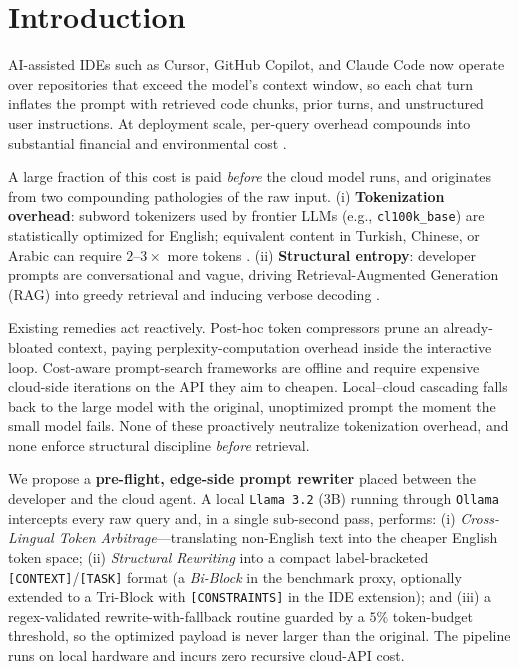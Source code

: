 \documentclass[11pt,a4paper,twocolumn]{article}
\begin{document}
\section{Introduction}
AI-assisted IDEs such as Cursor, GitHub Copilot, and Claude Code now operate over repositories that exceed the model's context window, so each chat turn inflates the prompt with retrieved code chunks, prior turns, and unstructured user instructions. At deployment scale, per-query overhead compounds into substantial financial and environmental cost \cite{du2026ockbench, peng2025coffe}.

A large fraction of this cost is paid \textit{before} the cloud model runs, and originates from two compounding pathologies of the raw input. (i) \textbf{Tokenization overhead}: subword tokenizers used by frontier LLMs (e.g., \texttt{cl100k\_base}) are statistically optimized for English; equivalent content in Turkish, Chinese, or Arabic can require $2$--$3\times$ more tokens \cite{petrov2023language, teklehaymanot2025tokenization}. (ii) \textbf{Structural entropy}: developer prompts are conversational and vague, driving Retrieval-Augmented Generation (RAG) into greedy retrieval \cite{jimenez2024swebench} and inducing verbose decoding \cite{ahuja2025efficientxlang}.

Existing remedies act reactively. Post-hoc token compressors \cite{jiang-etal-2023-llmlingua, shi2025longcodezip} prune an already-bloated context, paying perplexity-computation overhead inside the interactive loop. Cost-aware prompt-search frameworks \cite{taherkhani2025epic, zehle2025capo} are offline and require expensive cloud-side iterations on the API they aim to cheapen. Local--cloud cascading \cite{lu2026mccom, chen2024modelcascading} falls back to the large model with the original, unoptimized prompt the moment the small model fails. None of these proactively neutralize tokenization overhead, and none enforce structural discipline \textit{before} retrieval.

We propose a \textbf{pre-flight, edge-side prompt rewriter} placed between the developer and the cloud agent. A local \texttt{Llama 3.2} (3B) \cite{meta2024llama32} running through \texttt{Ollama} intercepts every raw query and, in a single sub-second pass, performs: (i) \textit{Cross-Lingual Token Arbitrage}---translating non-English text into the cheaper English token space; (ii) \textit{Structural Rewriting} into a compact label-bracketed \texttt{[CONTEXT]}/\texttt{[TASK]} format (a \textit{Bi-Block} in the benchmark proxy, optionally extended to a Tri-Block with \texttt{[CONSTRAINTS]} in the IDE extension); and (iii) a regex-validated rewrite-with-fallback routine guarded by a $5\%$ token-budget threshold, so the optimized payload is never larger than the original. The pipeline runs on local hardware and incurs zero recursive cloud-API cost.
\end{document}
